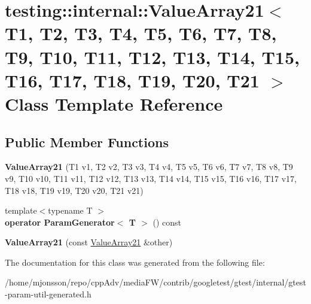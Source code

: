 \hypertarget{classtesting_1_1internal_1_1ValueArray21}{}\section{testing\+:\+:internal\+:\+:Value\+Array21$<$ T1, T2, T3, T4, T5, T6, T7, T8, T9, T10, T11, T12, T13, T14, T15, T16, T17, T18, T19, T20, T21 $>$ Class Template Reference}
\label{classtesting_1_1internal_1_1ValueArray21}
\subsection*{Public Member Functions}
\begin{DoxyCompactItemize}
\item 
\mbox{\label{classtesting_1_1internal_1_1ValueArray21_a111043ab8258ecb243c67c84d1f8e0f4}} 
{\bfseries Value\+Array21} (T1 v1, T2 v2, T3 v3, T4 v4, T5 v5, T6 v6, T7 v7, T8 v8, T9 v9, T10 v10, T11 v11, T12 v12, T13 v13, T14 v14, T15 v15, T16 v16, T17 v17, T18 v18, T19 v19, T20 v20, T21 v21)
\item 
\mbox{\label{classtesting_1_1internal_1_1ValueArray21_aa5b2264c55d6b5315622e2e5c3deeb35}} 
{\footnotesize template$<$typename T $>$ }\\{\bfseries operator Param\+Generator$<$ T $>$} () const
\item 
\mbox{\label{classtesting_1_1internal_1_1ValueArray21_af0804d08ff252ed8f942ac48f90ccef3}} 
{\bfseries Value\+Array21} (const \hyperlink{classtesting_1_1internal_1_1ValueArray21}{Value\+Array21} \&other)
\end{DoxyCompactItemize}


The documentation for this class was generated from the following file\+:\begin{DoxyCompactItemize}
\item 
/home/mjonsson/repo/cpp\+Adv/media\+F\+W/contrib/googletest/gtest/internal/gtest-\/param-\/util-\/generated.\+h\end{DoxyCompactItemize}

